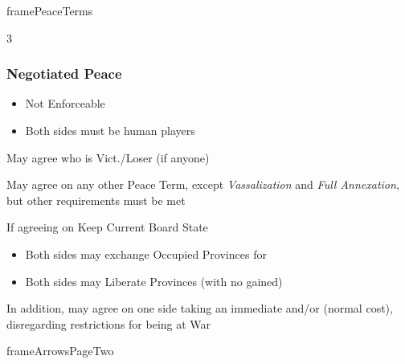 \documentclass[10pt]{article}
\newlength{\fhPeaceTerms} \setlength\fhPeaceTerms{45.5\baselineskip}
\begin{document}
\begin{dynamiccontents*}{framePeaceTerms}
\begin{eubox}{\fhPeaceTerms}
\begin{multicols}{3}
		\subsubsection*{Negotiated Peace }
		\begin{itemize}
			{
				\color{peaceReqColor}
				\item {}
				\begin{itemize}
					\item Not Enforceable
					\item Both sides must be human players
				\end{itemize}
			}
			\item May agree who is Vict./Loser (if anyone)
			\item May agree on any other Peace Term, except \emph{Vassalization} and \emph{Full Annexation}, but other requirements must be met
			\item If agreeing on Keep Current Board State 
			\begin{itemize}
				\item Both sides may exchange Occupied Provinces for \ducats
				\item Both sides may Liberate Provinces (with no \prestige gained)
			\end{itemize}
			\item In addition, may agree on one side taking an immediate  and/or  (normal cost), disregarding restrictions for being at War
		\end{itemize}
	\end{multicols}
\end{eubox}\end{dynamiccontents*}

\begin{dynamiccontents*}{frameArrowsPageTwo}
\end{dynamiccontents*}
\end{document}
